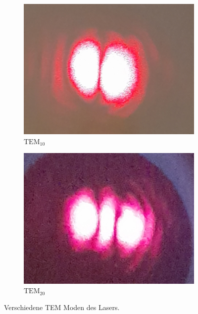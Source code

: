 \begin{figure}
  \begin{subfigure}{.45\textwidth}
    \centering 
    \includegraphics[width = \textwidth]{content/pics/TEM01.jpg}
    \caption{$\text{TEM}_{10}$}
    \label{fig:TEM01_pic}
  \end{subfigure}
  \hfill
  \begin{subfigure}{.45\textwidth}
    \centering 
    \includegraphics[width = \textwidth]{"content/pics/TEM02.jpg"}
    \caption{$\text{TEM}_{20}$}
    \label{fig:TEM02_pic}
  \end{subfigure}
  \caption{Verschiedene TEM Moden des Lasers.}
  \label{fig:TEM_Modes}
\end{figure}
